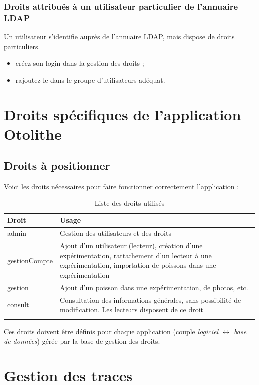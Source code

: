 \subsubsection{Droits attribués à un utilisateur particulier de l'annuaire LDAP}

Un utilisateur s'identifie auprès de l'annuaire LDAP, mais dispose de droits particuliers.

\begin{itemize}
\item créez son login dans la gestion des droits ;
\item rajoutez-le dans le groupe d'utilisateurs adéquat.
\end{itemize}


\section{Droits spécifiques de l'application Otolithe}

\subsection{Droits à positionner}
Voici les droits nécessaires pour faire fonctionner correctement l'application :

\begin{longtable}{|p{5cm}|p{10cm}|}
\hline
\textbf{Droit} & \textbf{Usage} \\
\hline
\endhead
admin &	Gestion des utilisateurs et des droits\\
\hline
gestionCompte &	Ajout d'un utilisateur (lecteur), création d'une expérimentation, rattachement d'un lecteur à une expérimentation, importation de poissons dans une expérimentation\\
\hline
gestion &	Ajout d'un poisson dans une expérimentation, de photos, etc. \\
\hline
consult	& Consultation des informations générales, sans possibilité de modification. Les lecteurs disposent de ce droit\\
\hline

\caption{\label{droitsCollec}Liste des droits utilisés}
\end{longtable}

Ces droits doivent être définis pour chaque application (couple \textit{logiciel} $\leftrightarrow$ \textit{base de données}) gérée par la base de gestion des droits.

\section{Gestion des traces}

